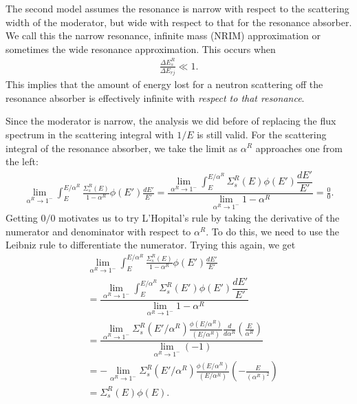 The second model assumes the resonance is narrow with respect to the scattering width of the moderator, but wide with respect to that for the resonance absorber. We call this the narrow resonance, infinite mass (NRIM) approximation or sometimes the wide resonance approximation. This occurs when
\begin{align}
  \frac{ \Delta E_s^R }{ \Delta E_{rj} } \ll 1 .
\end{align}
This implies that the amount of energy lost for a neutron scattering off the resonance absorber is effectively infinite with \emph{respect to that resonance}. 

Since the moderator is narrow, the analysis we did before of replacing the flux spectrum in the scattering integral with $1/E$ is still valid. For the scattering integral of the resonance absorber, we take the limit as $\alpha^R$ approaches one from the left:
\begin{align}
  \lim_{\alpha^R \rightarrow 1^-} \int_E^{E/\alpha^R} \frac{\Sigma_s^R(E)}{ 1 - \alpha^R } \phi(E') \frac{dE'}{E'} 
  = \dfrac{ \displaystyle\lim_{\alpha^R \rightarrow 1^-} \int_E^{E/\alpha^R} \Sigma_s^R(E) \phi(E') \dfrac{dE'}{E'} }{ \displaystyle\lim_{\alpha^R \rightarrow 1^-} 1 - \alpha^R } = \frac{0}{0} . \nonumber
\end{align}
Getting $0/0$ motivates us to try L'Hopital's rule by taking the derivative of the numerator and denominator with respect to $\alpha^R$. To do this, we need to use the Leibniz rule to differentiate the numerator. Trying this again, we get
\begin{align}
  &\lim_{\alpha^R \rightarrow 1^-} \int_E^{E/\alpha^R} \frac{\Sigma_s^R(E)}{ 1 - \alpha^R } \phi(E') \frac{dE'}{E'} \nonumber \\
  &= \dfrac{ \displaystyle\lim_{\alpha^R \rightarrow 1^-} \int_E^{E/\alpha^R} \Sigma_s^R(E') \phi(E') \dfrac{dE'}{E'} }{ \displaystyle\lim_{\alpha^R \rightarrow 1^-} 1 - \alpha^R }  \nonumber \\
  &= \dfrac{ \displaystyle\lim_{\alpha^R \rightarrow 1^-}  \Sigma_s^R(E'/\alpha^R) \frac{\phi(E/\alpha^R)}{(E/\alpha^R)} \frac{d}{d\alpha^R} \left( \frac{E}{\alpha^R} \right)  }{ \displaystyle\lim_{\alpha^R \rightarrow 1^-} (-1) } \nonumber \\
  &= - \displaystyle\lim_{\alpha^R \rightarrow 1^-}  \Sigma_s^R(E'/\alpha^R) \frac{\phi(E/\alpha^R)}{(E/\alpha^R)} \left( -\frac{E}{( \alpha^R )^2} \right) \nonumber \\
  &= \Sigma_s^R(E) \phi(E) .
\end{align}

